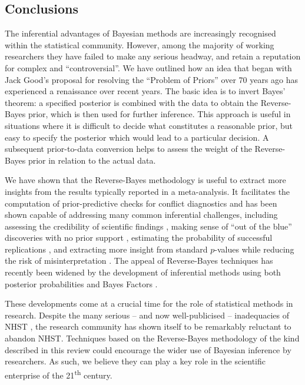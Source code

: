 \subsection{Conclusions}
The inferential advantages of Bayesian methods are increasingly recognised
within the statistical community. However, among the majority of working
researchers they have failed to make any serious headway, and retain a
reputation for complex and ``controversial''. We have outlined how an idea that
began with Jack Good's proposal for resolving the ``Problem of Priors'' over 70
years ago \citep{Good1950} has experienced a renaissance over recent years. The
basic idea is to invert Bayes' theorem: a specified posterior is combined with
the data to obtain the Reverse-Bayes prior, which is then used for further
inference. This approach is useful in situations where it is difficult to decide
what constitutes a reasonable prior, but easy to specify the posterior which
would lead to a particular decision. A subsequent prior-to-data conversion
\citep{Greenland2006} helps to assess the weight of the Reverse-Bayes prior in
relation to the actual data.

We have shown that the Reverse-Bayes methodology is useful to extract more
insights from the results typically reported in a meta-analysis. It facilitates
the computation of prior-predictive checks for conflict diagnostics
\citep{Presanis2013} and has been shown capable of addressing many common
inferential challenges, including assessing the credibility of scientific
findings \citep{Spiegelhalter2004,Greenland2011}, making sense of ``out of the
blue'' discoveries with no prior support \citep{Matthews2018, Held2019a},
estimating the probability of successful replications \citep{Held2019a,
  Held2020}, and extracting more insight from standard $p$-values while reducing
the risk of misinterpretation \citep{Held2013,Colquhoun2017,Colquhoun2019}. The
appeal of Reverse-Bayes techniques has recently been widened by the development
of inferential methods using both posterior probabilities and Bayes Factors
\citep{Carlin1996, Pawel2020b}.

These developments come at a crucial time for the role of statistical methods in
research. Despite the many serious -- and now well-publicised – inadequacies of
NHST \citep{Wasserstein2016}, the research community has shown itself to be
remarkably reluctant to abandon NHST. Techniques based on the Reverse-Bayes
methodology of the kind described in this review could encourage the wider use
of Bayesian inference by researchers. As such, we believe they can play a key
role in the scientific enterprise of the 21\textsuperscript{th} century.



